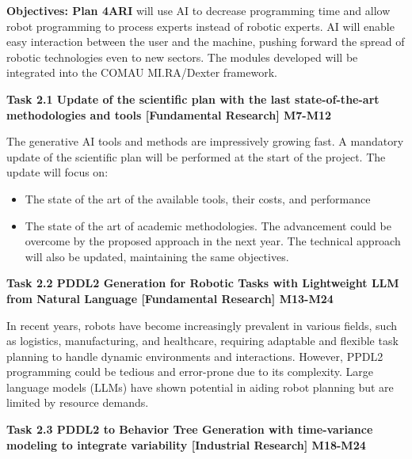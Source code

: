 \begin{planactivitybody}
\textbf{Objectives: Plan 4ARI} will use AI to decrease programming time
and allow robot programming to process experts instead of robotic
experts. AI will enable easy interaction between the user and the
machine, pushing forward the spread of robotic technologies even to new
sectors. The modules developed will be integrated into the COMAU
MI.RA/Dexter framework.

\plantaskskip
\textbf{Task 2.1 Update of the scientific plan with the last
state-of-the-art methodologies and tools {[}Fundamental Research{]}
M7-M12}

The generative AI tools and methods are impressively growing fast. A
mandatory update of the scientific plan will be performed at the start
of the project. The update will focus on:

\begin{itemize}
\item
  The state of the art of the available tools, their costs, and
  performance
\item
  The state of the art of academic methodologies. The advancement could
  be overcome by the proposed approach in the next year. The technical
  approach will also be updated, maintaining the same objectives.
\end{itemize}

\plantaskskip
\textbf{Task 2.2 PDDL2 Generation for Robotic Tasks with Lightweight LLM
from Natural Language {[}Fundamental Research{]} M13-M24}

In recent years, robots have become increasingly prevalent in various
fields, such as logistics, manufacturing, and healthcare, requiring
adaptable and flexible task planning to handle dynamic environments and
interactions. However, PPDL2 programming could be tedious and
error-prone due to its complexity. Large language models (LLMs) have
shown potential in aiding robot planning but are limited by resource
demands.

\plantaskskip
\textbf{Task 2.3 PDDL2 to Behavior Tree Generation with time-variance
modeling to integrate variability {[}Industrial Research{]} M18-M24}


\end{planactivitybody}
